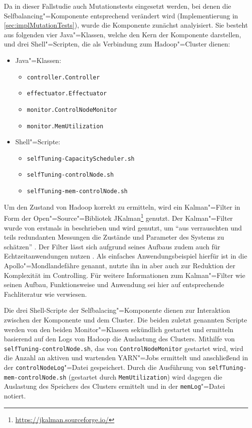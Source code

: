 Da in dieser Fallstudie auch Mutationstests eingesetzt werden, bei denen die Selfbalancing"=Komponente entsprechend verändert wird (Implementierung in \cref{sec:implMutationTests}), wurde die Komponente zunächst analyisiert.
Sie besteht aus folgenden vier Java"=Klassen, welche den Kern der Komponente darstellen, und drei Shell"=Scripten, die als Verbindung zum Hadoop"=Cluster dienen:

\begin{itemize}
    \item Java"=Klassen:
    \begin{itemize}
        \item \texttt{controller.Controller}
        \item \texttt{effectuator.Effectuator}
        \item \texttt{monitor.ControlNodeMonitor}
        \item \texttt{monitor.MemUtilization}
    \end{itemize}
    \item Shell"=Scripte:
    \begin{itemize}
        \item \texttt{selfTuning-CapacityScheduler.sh}
        \item \texttt{selfTuning-controlNode.sh}
        \item \texttt{selfTuning-mem-controlNode.sh}
    \end{itemize}
\end{itemize}

Um den Zustand von Hadoop korrekt zu ermitteln, wird ein Kalman"=Filter in Form der Open"=Source"=Bibliotek JKalman\footnote{\url{https://jkalman.sourceforge.io/}} genutzt.
Der Kalman"=Filter wurde von \citeauthor{Kalman1960} erstmals in \cite{Kalman1960} beschrieben und wird genutzt, um \enquote{aus verrauschten und teils redundanten Messungen die Zustände und Parameter des Systems zu schätzen} \cite{Marchthaler2017}.
Der Filter lässt sich aufgrund seines Aufbaus zudem auch für Echtzeitanwendungen nutzen \cite{Marchthaler2017}.
Als einfaches Anwendungsbeispiel hierfür ist in \cite{Marchthaler2017} die Apollo"=Mondlandefähre genannt, \citeauthor{Strukov2001} nutzte ihn in \cite{Strukov2001} aber auch zur Reduktion der Komplexität im Controlling.
Für weitere Informationen zum Kalman"=Filter wie seinen Aufbau, Funktionsweise und \gls{Anwendung} sei hier auf entsprechende Fachliteratur wie \zB \cite{Kim2016,Simon2006,Aggoun2004} verwiesen.

Die drei Shell-Scripte der Selfbalacing"=Komponente dienen zur Interaktion zwischen der Komponente und dem Cluster.
Die beiden zuletzt genannten Scripte werden von den beiden Monitor"=Klassen sekündlich gestartet und ermitteln basierend auf den Logs von Hadoop die Auslastung des Clusters.
Mithilfe von \texttt{selfTuning-controlNode.sh}, das von \texttt{ControlNodeMonitor} gestartet wird, wird die Anzahl an aktiven und wartenden \gls{YARN}"=Jobs ermittelt und anschließend in der \texttt{controlNodeLog}"=Datei gespeichert.
Durch die Ausführung von \texttt{selfTuning-mem-controlNode.sh} (gestartet durch \texttt{MemUtilization}) wird dagegen die Auslastung des Speichers des Clusters ermittelt und in der \texttt{memLog}"=Datei notiert.

